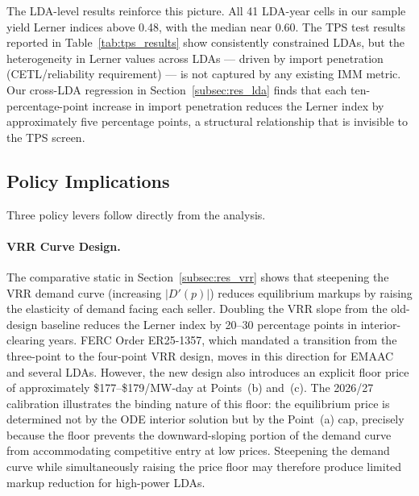 The LDA-level results reinforce this picture. All 41 LDA-year cells in our
sample yield Lerner indices above 0.48, with the median near 0.60. The TPS
test results reported in Table~\ref{tab:tps_results} show consistently
constrained LDAs, but the heterogeneity in Lerner values across LDAs ---
driven by import penetration (CETL/reliability requirement) --- is not
captured by any existing IMM metric. Our cross-LDA regression in
Section~\ref{subsec:res_lda} finds that each ten-percentage-point increase in
import penetration reduces the Lerner index by approximately five percentage
points, a structural relationship that is invisible to the TPS screen.

\subsection{Policy Implications}
\label{subsec:disc_policy}

Three policy levers follow directly from the analysis.

\paragraph{VRR Curve Design.}
The comparative static in Section~\ref{subsec:res_vrr} shows that
steepening the VRR demand curve (increasing $|D'(p)|$) reduces equilibrium
markups by raising the elasticity of demand facing each seller. Doubling the
VRR slope from the old-design baseline reduces the Lerner index by 20--30
percentage points in interior-clearing years. FERC Order ER25-1357, which
mandated a transition from the three-point to the four-point VRR design,
moves in this direction for EMAAC and several LDAs. However, the new design
also introduces an explicit floor price of approximately \$177--\$179/MW-day
at Points~(b) and~(c). The 2026/27 calibration illustrates the binding nature
of this floor: the equilibrium price is determined not by the ODE interior
solution but by the Point~(a) cap, precisely because the floor prevents the
downward-sloping portion of the demand curve from accommodating competitive
entry at low prices. Steepening the demand curve while simultaneously raising
the price floor may therefore produce limited markup reduction for high-power
LDAs.

